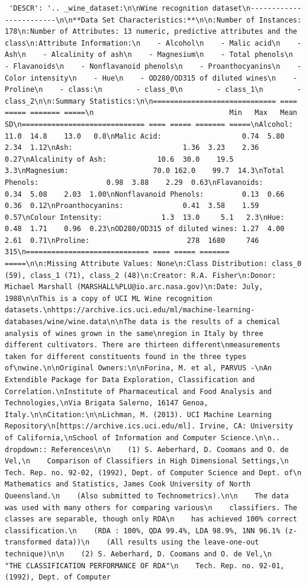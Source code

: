 \documentclass[
  letterpaper,
  DIV=11,
  numbers=noendperiod]{scrreprt}
\begin{document}
\begin{verbatim}
 'DESCR': '.. _wine_dataset:\n\nWine recognition dataset\n------------------------\n\n**Data Set Characteristics:**\n\n:Number of Instances: 178\n:Number of Attributes: 13 numeric, predictive attributes and the class\n:Attribute Information:\n    - Alcohol\n    - Malic acid\n    - Ash\n    - Alcalinity of ash\n    - Magnesium\n    - Total phenols\n    - Flavanoids\n    - Nonflavanoid phenols\n    - Proanthocyanins\n    - Color intensity\n    - Hue\n    - OD280/OD315 of diluted wines\n    - Proline\n    - class:\n        - class_0\n        - class_1\n        - class_2\n\n:Summary Statistics:\n\n============================= ==== ===== ======= =====\n                                Min   Max   Mean     SD\n============================= ==== ===== ======= =====\nAlcohol:                      11.0  14.8    13.0   0.8\nMalic Acid:                   0.74  5.80    2.34  1.12\nAsh:                          1.36  3.23    2.36  0.27\nAlcalinity of Ash:            10.6  30.0    19.5   3.3\nMagnesium:                    70.0 162.0    99.7  14.3\nTotal Phenols:                0.98  3.88    2.29  0.63\nFlavanoids:                   0.34  5.08    2.03  1.00\nNonflavanoid Phenols:         0.13  0.66    0.36  0.12\nProanthocyanins:              0.41  3.58    1.59  0.57\nColour Intensity:              1.3  13.0     5.1   2.3\nHue:                          0.48  1.71    0.96  0.23\nOD280/OD315 of diluted wines: 1.27  4.00    2.61  0.71\nProline:                       278  1680     746   315\n============================= ==== ===== ======= =====\n\n:Missing Attribute Values: None\n:Class Distribution: class_0 (59), class_1 (71), class_2 (48)\n:Creator: R.A. Fisher\n:Donor: Michael Marshall (MARSHALL%PLU@io.arc.nasa.gov)\n:Date: July, 1988\n\nThis is a copy of UCI ML Wine recognition datasets.\nhttps://archive.ics.uci.edu/ml/machine-learning-databases/wine/wine.data\n\nThe data is the results of a chemical analysis of wines grown in the same\nregion in Italy by three different cultivators. There are thirteen different\nmeasurements taken for different constituents found in the three types of\nwine.\n\nOriginal Owners:\n\nForina, M. et al, PARVUS -\nAn Extendible Package for Data Exploration, Classification and Correlation.\nInstitute of Pharmaceutical and Food Analysis and Technologies,\nVia Brigata Salerno, 16147 Genoa, Italy.\n\nCitation:\n\nLichman, M. (2013). UCI Machine Learning Repository\n[https://archive.ics.uci.edu/ml]. Irvine, CA: University of California,\nSchool of Information and Computer Science.\n\n.. dropdown:: References\n\n    (1) S. Aeberhard, D. Coomans and O. de Vel,\n    Comparison of Classifiers in High Dimensional Settings,\n    Tech. Rep. no. 92-02, (1992), Dept. of Computer Science and Dept. of\n    Mathematics and Statistics, James Cook University of North Queensland.\n    (Also submitted to Technometrics).\n\n    The data was used with many others for comparing various\n    classifiers. The classes are separable, though only RDA\n    has achieved 100% correct classification.\n    (RDA : 100%, QDA 99.4%, LDA 98.9%, 1NN 96.1% (z-transformed data))\n    (All results using the leave-one-out technique)\n\n    (2) S. Aeberhard, D. Coomans and O. de Vel,\n    "THE CLASSIFICATION PERFORMANCE OF RDA"\n    Tech. Rep. no. 92-01, (1992), Dept. of Computer 
\end{verbatim}
\end{document}
